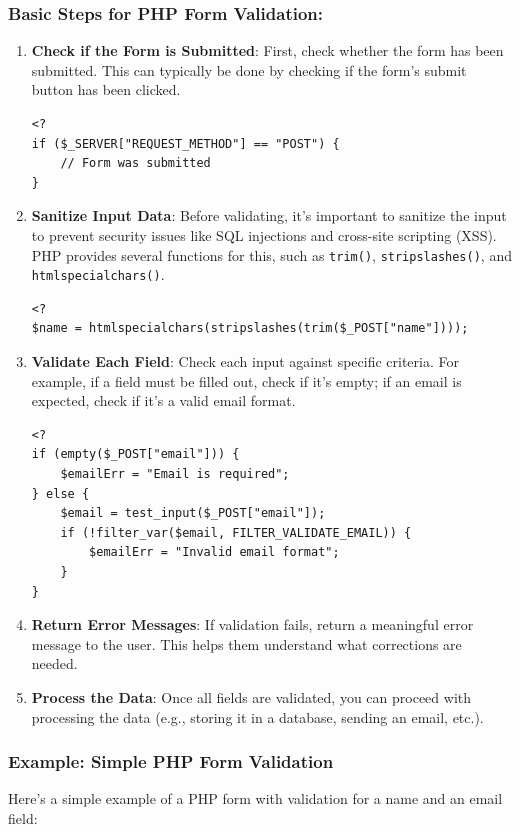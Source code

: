 \documentclass[11pt]{article}
\begin{document}
\subsubsection{Basic Steps for PHP Form Validation:}
\label{sec:org43971c3}
\begin{enumerate}
\item \textbf{Check if the Form is Submitted}: First, check whether the form has
been submitted. This can typically be done by checking if the form's
submit button has been clicked.

\begin{verbatim}
<?
if ($_SERVER["REQUEST_METHOD"] == "POST") {
    // Form was submitted
}
\end{verbatim}

\item \textbf{Sanitize Input Data}: Before validating, it's important to sanitize
the input to prevent security issues like SQL injections and
cross-site scripting (XSS). PHP provides several functions for this,
such as \texttt{trim()}, \texttt{stripslashes()}, and \texttt{htmlspecialchars()}.

\begin{verbatim}
<?
$name = htmlspecialchars(stripslashes(trim($_POST["name"])));
\end{verbatim}

\item \textbf{Validate Each Field}: Check each input against specific criteria.
For example, if a field must be filled out, check if it's empty; if
an email is expected, check if it's a valid email format.

\begin{verbatim}
<?
if (empty($_POST["email"])) {
    $emailErr = "Email is required";
} else {
    $email = test_input($_POST["email"]);
    if (!filter_var($email, FILTER_VALIDATE_EMAIL)) {
        $emailErr = "Invalid email format";
    }
}
\end{verbatim}

\item \textbf{Return Error Messages}: If validation fails, return a meaningful
error message to the user. This helps them understand what
corrections are needed.

\item \textbf{Process the Data}: Once all fields are validated, you can proceed
with processing the data (e.g., storing it in a database, sending an
email, etc.).
\end{enumerate}

\subsubsection{Example: Simple PHP Form Validation}
\label{sec:org10e1a86}
Here's a simple example of a PHP form with validation for a name and an
email field:
\end{document}
